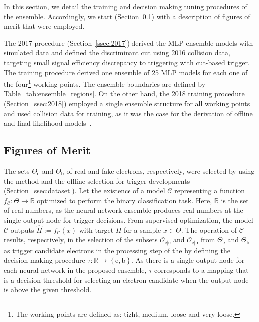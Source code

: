 In this section, we detail the training and decision making tuning procedures
of the \rnn ensemble. Accordingly, we start (Section~\ref{ssec:fom}) with a
description of figures of merit that were employed.

The 2017 procedure (Section~\ref{ssec:2017}) derived the MLP ensemble
models with simulated data and defined the discriminant cut using
2016 collision data, targeting small signal efficiency discrepancy to triggering 
with cut-based trigger. The training procedure derived one ensemble of 25 MLP models for each one of the four\footnote{The working points are defined as: tight, medium, loose and very-loose.} working points. The ensemble boundaries are defined by Table~\ref{tab:ensemble_regions}. On the other hand, the 2018 training procedure (Section~\ref{ssec:2018})
employed a single ensemble structure for all working points and used
collision data for training, as it was the case for the derivation of offline
and final \hlt likelihood models~\cite{aaboud2019electron}.






\subsection{Figures of Merit}\label{ssec:fom}



The sets $\Theta_{\text{e}}$ and $\Theta_{\text{b}}$ of real and fake electrons, respectively, were selected by using the \tnp{} method and the offline selection for trigger developments (Section~\ref{ssec:dataset}). Let the existence of a model $\mathcal{C}$ representing a function $f_{\mathcal{C}} : \Theta \rightarrow \mathbb{R}$ optimized to perform the binary classification task. Here, $\mathbb{R}$ is the set of real numbers, as the neural network ensemble produces real numbers at the single output node for trigger decisions.  From supervised optimization, the model $\mathcal{C}$ outputs $\hat{H}:=f_{\mathcal{C}}(x)$ with target $H$ for a sample $x \in \Theta$. The operation of $\mathcal{C}$ results, respectively, in the selection of the subsets $\mathcal{O}_{\text{e}|\text{e}}$ and $\mathcal{O}_{\text{e}|\text{b}}$ from $\Theta_{\text{e}}$ and $\Theta_{\text{b}}$ as trigger candidate electrons in the \fastcalo{} processing step of the \hlt{} by defining the decision making procedure $\tau : \mathbb{R} \rightarrow \left\{\text{e},\text{b}\right\}$. As there is a single output node for each neural network in the proposed \rnn{} ensemble, $\tau$ corresponds to a mapping that is a decision threshold for selecting an electron candidate when the output node is above the given threshold.  


